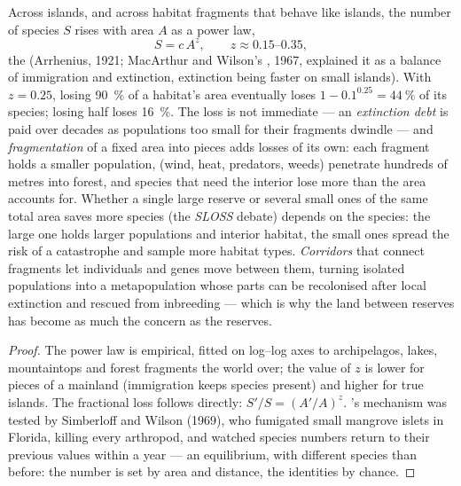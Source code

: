 \begin{proposition}\label{prop:b3:conservation-biology:area}
Across islands, and across habitat fragments that behave like islands,
the number of species $S$ rises with area $A$ as a power law,
\[
S = c\,A^{z}, \qquad z \approx 0.15\text{--}0.35,
\]
the \emph{} (Arrhenius, 1921; MacArthur and
Wilson's , 1967, explained it as a balance of
immigration and extinction, extinction being faster on small islands).
With $z = 0.25$, losing \qty{90}{\%} of a habitat's area eventually loses
$1 - 0.1^{0.25} = \qty{44}{\%}$ of its species; losing half loses
\qty{16}{\%}. The loss is not immediate --- an \emph{extinction debt} is
paid over decades as populations too small for their fragments dwindle
--- and \emph{fragmentation} of a fixed area into pieces adds losses of
its own: each fragment holds a smaller population, \emph{}
(wind, heat, predators, weeds) penetrate hundreds of metres into
forest, and species that need the interior lose more than the area
accounts for. Whether a single large reserve or several small ones of
the same total area saves more species (the \emph{SLOSS} debate) depends
on the species: the large one holds larger populations and interior
habitat, the small ones spread the risk of a catastrophe and sample
more habitat types. \emph{Corridors} that connect fragments let
individuals and genes move between them, turning isolated populations
into a metapopulation whose parts can be recolonised after local
extinction and rescued from inbreeding --- which is why the land
between reserves has become as much the concern as the reserves.
\end{proposition}
\begin{proof}
The power law is empirical, fitted on log--log axes to archipelagos,
lakes, mountaintops and forest fragments the world over; the value of
$z$ is lower for pieces of a mainland (immigration keeps species
present) and higher for true islands. The fractional loss follows
directly: $S'/S = (A'/A)^{z}$. 's mechanism was
tested by Simberloff and Wilson (1969), who fumigated small mangrove
islets in Florida, killing every arthropod, and watched species
numbers return to their previous values within a year --- an
equilibrium, with different species than before: the number is set by
area and distance, the identities by chance.
\end{proof}

